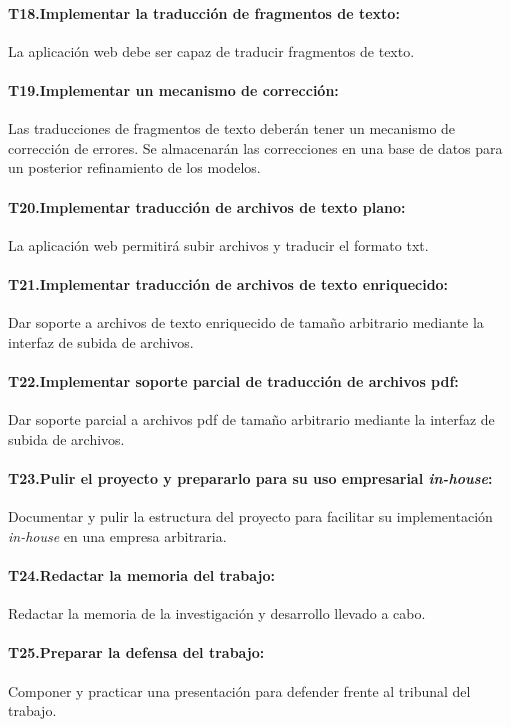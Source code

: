 \paragraph{T18.\quad Implementar la traducción de fragmentos de texto:}\label{T18}
La aplicación web debe ser capaz de traducir fragmentos de texto.
\paragraph{T19.\quad Implementar un mecanismo de corrección:}\label{T19}
Las traducciones de fragmentos de texto deberán tener un mecanismo de corrección de errores.
Se almacenarán las correcciones en una base de datos para un posterior
refinamiento de los modelos.
\paragraph{T20.\quad Implementar traducción de archivos de texto plano:}\label{T20}
La aplicación web permitirá subir archivos y traducir el formato txt.
\paragraph{T21.\quad Implementar traducción de archivos de texto enriquecido:}\label{T21}
Dar soporte a archivos de texto enriquecido de tamaño arbitrario mediante la interfaz
de subida de archivos.
\paragraph{T22.\quad Implementar soporte parcial de traducción de archivos pdf:}\label{T22}
Dar soporte parcial a archivos pdf de tamaño arbitrario mediante la interfaz
de subida de archivos.
\paragraph{T23.\quad Pulir el proyecto y prepararlo para su uso empresarial \textit{in-house}:}\label{T23}
Documentar y pulir la estructura del proyecto para facilitar su implementación \textit{in-house}
en una empresa arbitraria.
\paragraph{T24.\quad Redactar la memoria del trabajo:}\label{T24}
Redactar la memoria de la investigación y desarrollo llevado a cabo.
\paragraph{T25.\quad Preparar la defensa del trabajo:}\label{T25}
Componer y practicar una presentación para defender frente al tribunal del trabajo.


